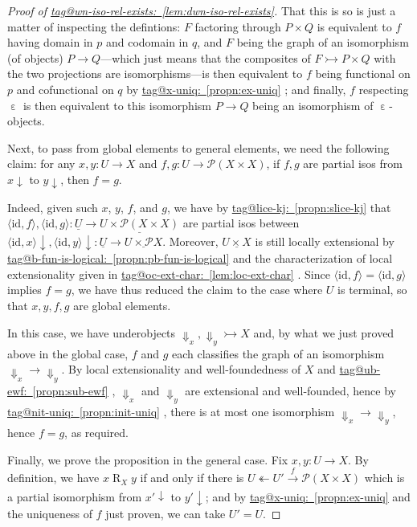 \documentclass{amsart}
\makeatletter
\newcommand\br[1]{\langle{}#1\rangle{}}
\newcommand\dwn{\mathpunct{\downarrow}}
\newcommand\Dwn{{\Downarrow}}
\newcommand\ein{\mathrel{\varepsilon}}
\newcommand\id{\mathrm{id}}
\newcommand\oot{\twoheadleftarrow}
\newcommand\pow{\mathcal{P}}
\newcommand\Rrel{\mathrel{R}}
\newcommand\tox[2][]{\xrightarrow[#1]{#2}}
\newcommand\tto{\rightarrowtail}
\newcommand\und[1]{\underline{#1}}
\newcommand\tagword[1]{\csname tag@#1\endcsname}
\def\label@tag#1:#2\@nil{#1}
\newcommand\labeltag[1]{\label@tag#1:\@nil}
\newcommand\jref[1]{%
  \texorpdfstring%
    {\hyperref[#1]{\tagword{\labeltag{#1}}~\ref*{#1}}}%
    {\tagword{\labeltag{#1}}~\ref*{#1}}%
}
\theoremstyle{definition}
\theoremstyle{remark}
\theoremstyle{plainwithref}
\makeatother
\begin{document}
\begin{proof}[Proof of \jref{lem:dwn-iso-rel-exists}]
That this is so is just a matter of inspecting the defintions: \( F \) factoring through \( P \times Q \) is equivalent to \( f \) having domain in \( p \) and codomain in \( q \), and \( F \) being the graph of an isomorphism (of objects) \( P \to Q \)---which just means that the composites of \( F \tto P \times Q \) with the two projections are isomorphisms---is then equivalent to \( f \) being functional on \( p \) and cofunctional on \( q \) by \jref{propn:ex-uniq}; and finally, \( f \) respecting \( \ein \) is then equivalent to this isomorphism \( P \to Q \) being an isomorphism of \( \ein \)-objects.

Next, to pass from global elements to general elements, we need the following claim:
 for any \( x,y \colon U \to X \) and \( f,g \colon U \to \pow(X \times X) \), if \( f,g \) are partial isos from \( x \dwn \) to \( y \dwn \), then \( f = g \).

 Indeed, given such \( x \), \( y \), \( f \), and \( g \), we have by \jref{propn:slice-kj} that \( \br{\id,f},\br{\id,g} \colon \und{U} \to \und{U \times \pow(X \times X)} \) are partial isos between \( \br{\id, x} \dwn,\br{\id, y} \dwn \colon \und{U} \to \und{U \times \pow X} \).
  Moreover, \( \und{U \times X} \) is still locally extensional by \jref{propn:pb-fun-is-logical} and the characterization of local extensionality given in \jref{lem:loc-ext-char}.
  Since \( \br{\id,f} = \br{\id,g} \) implies \( f = g \), we have thus reduced the claim to the case where \( U \) is terminal, so that \( x,y,f,g \) are global elements.

  In this case, we have underobjects \( \Dwn_x,\Dwn_y \tto X \) and, by what we just proved above in the global case, \( f \) and \( g \) each classifies the graph of an isomorphism \( \Dwn_x \to \Dwn_y \).
  By local extensionality and well-foundedness of \( X \) and \jref{propn:sub-ewf}, \( \Dwn_x \) and \( \Dwn_y \) are extensional and well-founded, hence by \jref{propn:init-uniq}, there is at most one isomorphism \( \Dwn_x \to \Dwn_y \), hence \( f = g \), as required.

  Finally, we prove the proposition in the general case.
  Fix \( x,y \colon U \to X \).
  By definition, we have \( x \Rrel_X y \) if and only if there is \( U \oot U' \tox{f} \pow(X \times X) \) which is a partial isomorphism from \( x' \dwn \) to \( y' \dwn \); and by \jref{propn:ex-uniq} and the uniqueness of \( f \) just proven, we can take \( U' = U \).


\end{proof}
\end{document}
